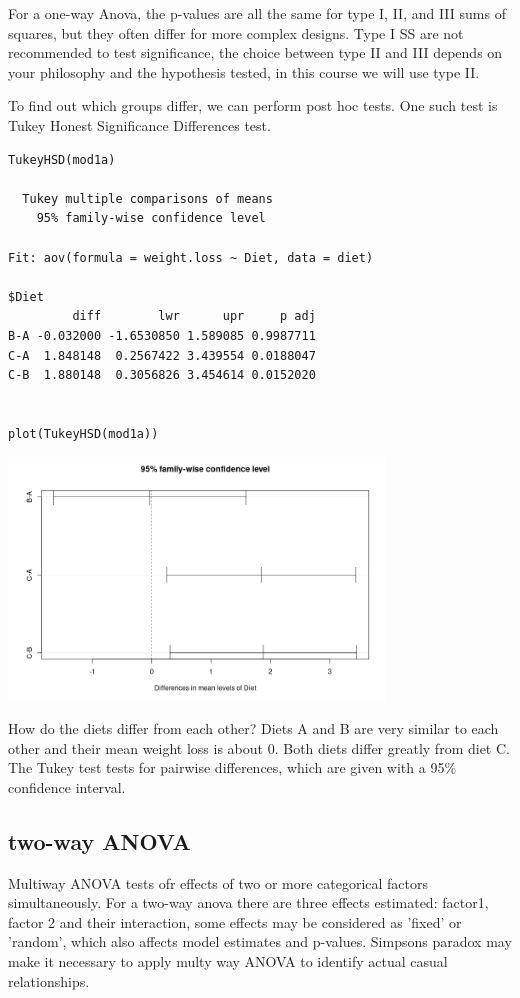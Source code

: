 \documentclass{article}
\begin{document}
For a one-way Anova, the p-values are all the same for type I, II, and III sums of squares, but they often differ for more complex designs. Type I SS are not recommended to test significance, the choice between type II and III depends on your philosophy and the hypothesis tested, in this course we will use type II.\par 

To find out which groups differ, we can perform post hoc tests. One such test is Tukey Honest Significance Differences test.

\begin{lstlisting}
TukeyHSD(mod1a)

  Tukey multiple comparisons of means
    95% family-wise confidence level

Fit: aov(formula = weight.loss ~ Diet, data = diet)

$Diet
         diff        lwr      upr     p adj
B-A -0.032000 -1.6530850 1.589085 0.9987711
C-A  1.848148  0.2567422 3.439554 0.0188047
C-B  1.880148  0.3056826 3.454614 0.0152020


plot(TukeyHSD(mod1a))
\end{lstlisting}
\begin{center}
    \includegraphics[width = 0.75\textwidth]{lab2/posthoc.png}
\end{center}

How do the diets differ from each other? Diets A and B are very similar to each other and their mean weight loss is about 0. Both diets differ greatly from diet C. The Tukey test tests for pairwise differences, which are given with a 95\% confidence interval.\par 

\subsection{two-way ANOVA}
Multiway ANOVA tests ofr effects of two or more categorical factors simultaneously. For a two-way anova there are three effects estimated: factor1, factor 2 and their interaction, some effects may be considered as 'fixed' or 'random', which also affects model estimates and p-values. Simpsons paradox may make it necessary to apply multy way ANOVA to identify actual casual relationships.
\end{document}

